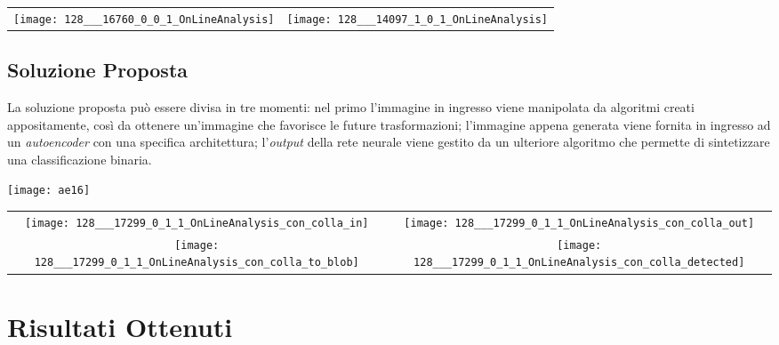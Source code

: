 \documentclass[a0,portrait]{a0poster}
\begin{document}
\begin{multicols}{2}
\begin{center}
    \begin{tabular}{cc} \label{griglia_dataset}
      \texttt{[image: 128\_\_\_16760\_0\_0\_1\_OnLineAnalysis]} &
      \texttt{[image: 128\_\_\_14097\_1\_0\_1\_OnLineAnalysis]}
    \end{tabular}
\end{center}
  


\subsection*{Soluzione Proposta}
La soluzione proposta può essere divisa in tre momenti:
nel primo l'immagine in ingresso viene manipolata da algoritmi creati appositamente, così da ottenere un'immagine che favorisce le future trasformazioni;
l'immagine appena generata viene fornita in ingresso ad un \textit{autoencoder} con una specifica architettura;
l'\textit{output} della rete neurale viene gestito da un ulteriore algoritmo che permette di sintetizzare una classificazione binaria.

\begin{minipage}[c]{0.25\textwidth}
\centering\texttt{[image: ae16]}
    \label{ae}
\end{minipage}
\begin{minipage}[c]{0.29\textwidth}
  \centering
    \begin{tabular}{cc} \label{griglia_fig}
      \texttt{[image: 128\_\_\_17299\_0\_1\_1\_OnLineAnalysis\_con\_colla\_in]} &
      \texttt{[image: 128\_\_\_17299\_0\_1\_1\_OnLineAnalysis\_con\_colla\_out]} \\
      \texttt{[image: 128\_\_\_17299\_0\_1\_1\_OnLineAnalysis\_con\_colla\_to\_blob]} &
      \texttt{[image: 128\_\_\_17299\_0\_1\_1\_OnLineAnalysis\_con\_colla\_detected]}
    \end{tabular}
\end{minipage}


\section*{Risultati Ottenuti}


\end{multicols}
\end{document}
